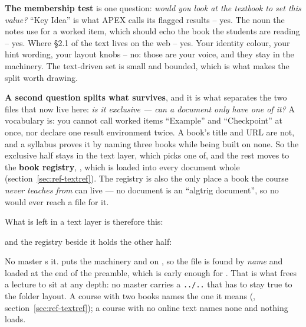 \textbf{The membership test} is one question: \emph{would you look at the
textbook to set this value?} ``Key Idea'' is what APEX calls its flagged
results -- yes. The noun the notes use for a worked item, which should
echo the book the students are reading -- yes. Where \S2.1 of the text
lives on the web -- yes. Your identity colour, your hint wording, your
layout knobs -- no: those are your voice, and they stay in the machinery.
The text-driven set is small and bounded, which is what makes the split
worth drawing.

\textbf{A second question splits what survives}, and it is what separates
the two files that now live here: \emph{is it exclusive --- can a document
only have one of it?} A vocabulary is: you cannot call worked items
``Example'' and ``Checkpoint'' at once, nor declare one result environment
twice. A book's title and URL are not, and a syllabus proves it by naming
three books while being built on none. So the exclusive half stays in the
text layer, which  picks one of, and the rest moves to the
\textbf{book registry}, , which is
loaded into every document whole (section~\ref{sec:ref-textref}). The
registry is also the only place a book the course \emph{never teaches
from} can live --- no document is an ``algtrig document'', so no
 would ever reach a file for it.

What is left in a text layer is therefore this:

\begin{manexsource}
\ifdefined\NewTextResult
\fi


\end{manexsource}

\noindent and the registry beside it holds the other half:

\begin{manexsource}
\end{manexsource}

No master s it.  puts the machinery and
 on
, so the file is found by \emph{name} and loaded at the end
of the preamble, which is early enough for . That is what
frees a lecture to sit at any depth: no master carries a \texttt{../..}
that has to stay true to the folder layout. A course with two books names
the one it means (, section~\ref{sec:ref-textref}); a course
with no online text names none and nothing loads.

